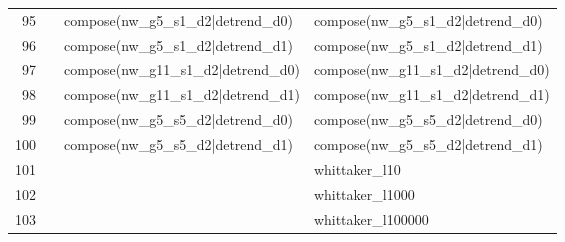 \begin{tabular}{rlll}
95 &  & compose(nw\_g5\_s1\_d2|detrend\_d0) & compose(nw\_g5\_s1\_d2|detrend\_d0) \\
96 &  & compose(nw\_g5\_s1\_d2|detrend\_d1) & compose(nw\_g5\_s1\_d2|detrend\_d1) \\
97 &  & compose(nw\_g11\_s1\_d2|detrend\_d0) & compose(nw\_g11\_s1\_d2|detrend\_d0) \\
98 &  & compose(nw\_g11\_s1\_d2|detrend\_d1) & compose(nw\_g11\_s1\_d2|detrend\_d1) \\
99 &  & compose(nw\_g5\_s5\_d2|detrend\_d0) & compose(nw\_g5\_s5\_d2|detrend\_d0) \\
100 &  & compose(nw\_g5\_s5\_d2|detrend\_d1) & compose(nw\_g5\_s5\_d2|detrend\_d1) \\
101 &  &  & whittaker\_l10 \\
102 &  &  & whittaker\_l1000 \\
103 &  &  & whittaker\_l100000 \\
\bottomrule
\end{tabular}
